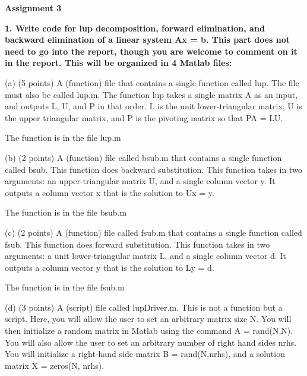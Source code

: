 \documentclass{report}
\begin{document}
 
\begin{center}

\textbf{Assignment 3}
\end{center}

\begin{flushleft}
\textbf{1. Write code for lup decomposition, forward elimination, and backward elimination of a linear system Ax = b. This part does not need to go into the report, though you are welcome to comment on it in the report. This will be organized in 4 Matlab files:}
\end{flushleft}

\begin{flushleft}
(a) (5 points) A (function) file that contains a single function called lup. The file must also be called lup.m. The function lup takes a single matrix A as an input, and outputs L, U, and P in that order. L is the unit lower-triangular matrix, U is the upper triangular matrix, and P is the pivoting matrix so that PA = LU.
\end{flushleft}

\begin{flushleft}
The function is in the file lup.m
\end{flushleft}

\begin{flushleft}
(b) (2 points) A (function) file called bsub.m that contains a single function called bsub. This function does backward substitution. This function takes in two arguments: an upper-triangular matrix U, and a single column vector y. It outputs a column vector x that is the solution to Ux = y.
\end{flushleft}

\begin{flushleft}
The function is in the file bsub.m
\end{flushleft}

\begin{flushleft}
(c) (2 points) A (function) file called fsub.m that contains a single function called fsub. This function does forward substitution. This function takes in two arguments: a unit lower-triangular matrix L, and a single column vector d. It outputs a column vector y that is the solution to Ly = d.
\end{flushleft}

\begin{flushleft}
The function is in the file fsub.m
\end{flushleft}

\begin{flushleft}
(d) (3 points) A (script) file called lupDriver.m. This is not a function but a script. Here, you will allow the user to set an arbitrary matrix size N. You will then initialize a random matrix in Matlab using the command A = rand(N,N). You will also allow the user to set an arbitrary number of right hand sides nrhs. You will initialize a right-hand side matrix B = rand(N,nrhs), and a solution matrix X = zeros(N, nrhs).
\end{flushleft}
\end{document}
